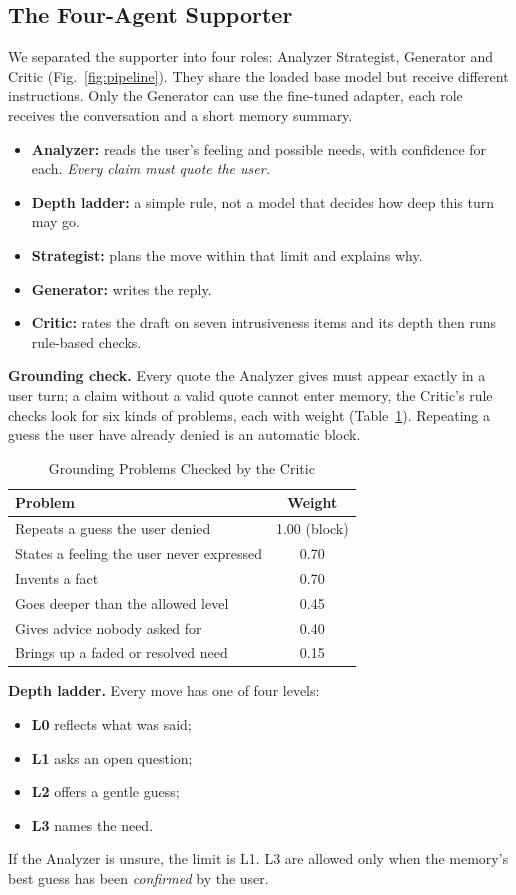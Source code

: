 \documentclass[journal]{IEEEtran}
\newcommand{\tsize}{\footnotesize}
\begin{document}
\subsection{The Four-Agent Supporter}\label{sec:agents}
We separated the supporter into four roles: Analyzer Strategist, Generator and Critic (Fig.~\ref{fig:pipeline}). They share the loaded base model but receive different instructions. Only the Generator can use the fine-tuned adapter, each role receives the conversation and a short memory summary.
\begin{itemize}
\item \textbf{Analyzer:} reads the user's feeling and possible needs, with confidence for each. \emph{Every claim must quote the user.}
\item \textbf{Depth ladder:} a simple rule, not a model that decides how deep this turn may go.
\item \textbf{Strategist:} plans the move within that limit and explains why.
\item \textbf{Generator:} writes the reply.
\item \textbf{Critic:} rates the draft on seven intrusiveness items and its depth then runs rule-based checks.
\end{itemize}
\textbf{Grounding check.} Every quote the Analyzer gives must appear exactly in a user turn; a claim without a valid quote cannot enter memory, the Critic's rule checks look for six kinds of problems, each with weight (Table~\ref{tab:viol}). Repeating a guess the user have already denied is an automatic block.

\begin{table}[!htb]
\caption{Grounding Problems Checked by the Critic}
\label{tab:viol}
\centering\tsize
\begin{tabular}{@{}lc@{}}
\toprule
Problem & Weight\\
\midrule
Repeats a guess the user denied & 1.00 (block)\\
States a feeling the user never expressed & 0.70\\
Invents a fact & 0.70\\
Goes deeper than the allowed level & 0.45\\
Gives advice nobody asked for & 0.40\\
Brings up a faded or resolved need & 0.15\\
\bottomrule
\end{tabular}
\end{table}

\textbf{Depth ladder.} Every move has one of four levels:
\begin{itemize}
\item \textbf{L0} reflects what was said;
\item \textbf{L1} asks an open question;
\item \textbf{L2} offers a gentle guess;
\item \textbf{L3} names the need.
\end{itemize}
If the Analyzer is unsure, the limit is L1. L3 are allowed only when the memory's best guess has been \emph{confirmed} by the user.
\end{document}
